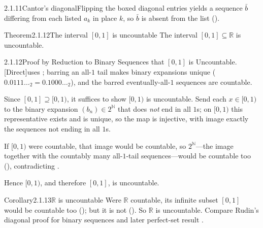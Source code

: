 \documentclass[main.tex]{subfiles}
\begin{document}
\begin{Fig}{2.1.11}{Cantor's diagonal}{Flipping the boxed diagonal entries yields a sequence $\bar b$ differing from each listed $a_k$ in place $k$, so $\bar b$ is absent from the list ().}
\end{Fig}

\begin{Obj}{Theorem}{2.1.12}{The interval $[0,1]$ is uncountable}
The interval $[0,1]\subseteq\mathbb R$ is uncountable.
\end{Obj}
\begin{Prf}{2.1.12}{Proof by Reduction to Binary Sequences that $[0,1]$ is Uncountable.}{[Direct]\quad uses ; barring an all-$1$ tail makes binary expansions unique ($0.0111\ldots_2=0.1000\ldots_2$), and the barred eventually-all-$1$ sequences are countable.}
\item Since $[0,1]\supseteq[0,1)$, it suffices to show $[0,1)$ is uncountable. Send each $x\in[0,1)$
  to the binary expansion $(b_n)\in 2^{\mathbb N}$ that does \emph{not} end in all $1$s; on $[0,1)$
  this representative exists and is unique, so the map is injective, with image exactly the
  sequences not ending in all $1$s.
\item If $[0,1)$ were countable, that image would be countable, so $2^{\mathbb N}$---the image
  together with the countably many all-$1$-tail sequences---would be countable too (),
  contradicting .
\item Hence $[0,1)$, and therefore $[0,1]$, is uncountable.
\end{Prf}

\begin{Obj}{Corollary}{2.1.13}{$\mathbb R$ is uncountable}
Were $\mathbb R$ countable, its infinite subset $[0,1]$ would be countable too (); but
it is not (). So $\mathbb R$ is uncountable.
Compare Rudin's diagonal proof for binary sequences  and later perfect-set result .
\end{Obj}
\end{document}
